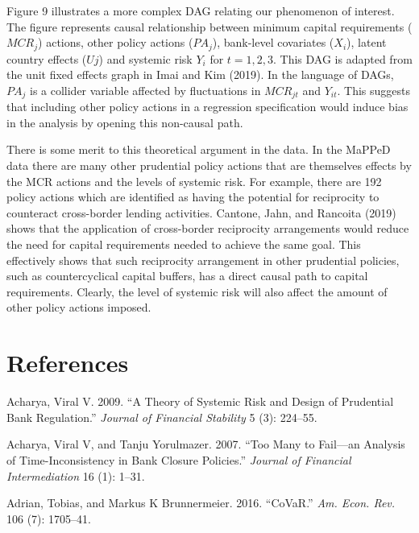 \documentclass[
  10pt,
]{article}
\begin{document}
Figure 9 illustrates a more complex DAG relating our phenomenon of
interest. The figure represents causal relationship between minimum
capital requirements (\(MCR_j\)) actions, other policy actions
(\(PA_j\)), bank-level covariates (\(X_i\)), latent country effects
(\(Uj\)) and systemic risk \(Y_i\) for \(t=1,2,3\). This DAG is adapted
from the unit fixed effects graph in Imai and Kim (2019). In the
language of DAGs, \(PA_j\) is a collider variable affected by
fluctuations in \(MCR_{jt}\) and \(Y_{it}\). This suggests that
including other policy actions in a regression specification would
induce bias in the analysis by opening this non-causal path.

There is some merit to this theoretical argument in the data. In the
MaPPeD data there are many other prudential policy actions that are
themselves effects by the MCR actions and the levels of systemic risk.
For example, there are 192 policy actions which are identified as having
the potential for reciprocity to counteract cross-border lending
activities. Cantone, Jahn, and Rancoita (2019) shows that the
application of cross-border reciprocity arrangements would reduce the
need for capital requirements needed to achieve the same goal. This
effectively shows that such reciprocity arrangement in other prudential
policies, such as countercyclical capital buffers, has a direct causal
path to capital requirements. Clearly, the level of systemic risk will
also affect the amount of other policy actions imposed.

\hypertarget{references}{%
\section{References}\label{references}}

\setlength{\parindent}{-0.2in}
\setlength{\leftskip}{0.2in}
\setlength{\parskip}{8pt}
\vspace*{-0.2in}

\noindent

\hypertarget{refs}{}
\leavevmode\hypertarget{ref-Acharya2009}{}%
Acharya, Viral V. 2009. ``A Theory of Systemic Risk and Design of
Prudential Bank Regulation.'' \emph{Journal of Financial Stability} 5
(3): 224--55.

\leavevmode\hypertarget{ref-Acharya2007}{}%
Acharya, Viral V, and Tanju Yorulmazer. 2007. ``Too Many to Fail---an
Analysis of Time-Inconsistency in Bank Closure Policies.'' \emph{Journal
of Financial Intermediation} 16 (1): 1--31.

\leavevmode\hypertarget{ref-Adrian2016}{}%
Adrian, Tobias, and Markus K Brunnermeier. 2016. ``CoVaR.'' \emph{Am.
Econ. Rev.} 106 (7): 1705--41.
\end{document}
